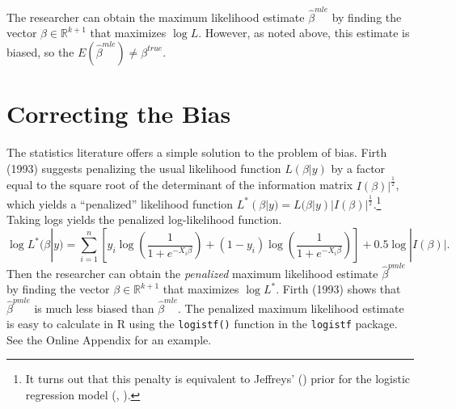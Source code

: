 \documentclass[12pt]{article}
\begin{document}
%

The researcher can obtain the maximum likelihood estimate $\hat{\beta}^{mle}$ by finding the vector $\beta \in \mathbb{R}^{k + 1}$ that maximizes $\log L$. However, as noted above, this estimate is biased, so the $E(\hat{\beta}^{mle}) \neq \beta^{true}$.

\section*{Correcting the Bias}

The statistics literature offers a simple solution to the problem of bias. Firth (1993) suggests penalizing the usual likelihood function $L(\beta | y)$ by a factor equal to the square root of the determinant of the information matrix $I(\beta)|^\frac{1}{2}$, which yields a ``penalized'' likelihood function $L^*(\beta | y) = L(\beta | y)|I(\beta)|^\frac{1}{2}$.\footnote{It turns out that this penalty is equivalent to Jeffreys' (\citeyear{Jeffreys1946}) prior for the logistic regression model (\citealt{Firth1993}, \citealt{Poirier1994}).} Taking logs yields the penalized log-likelihood function.
\begin{equation}\nonumber
\log L^*(\beta | y) = \displaystyle \sum_{i = 1}^n \left[y_i \log \left( \dfrac{1}{1 + e^{-X_i\beta}}\right) + (1 - y_i) \log \left( \dfrac{1}{1 + e^{-X_i\beta}}\right)\right] + 0.5 \log |I(\beta)|.
\end{equation}
Then the researcher can obtain the \emph{penalized} maximum likelihood estimate $\hat{\beta}^{pmle}$ by finding the vector $\beta \in \mathbb{R}^{k + 1}$ that maximizes $\log L^*$. Firth (1993) shows that $\hat{\beta}^{pmle}$ is much less biased than $\hat{\beta}^{mle}$. The penalized maximum likelihood estimate is easy to calculate in R using the \texttt{logistf()} function in the \texttt{logistf} package. See the Online Appendix for an example.
\end{document}
